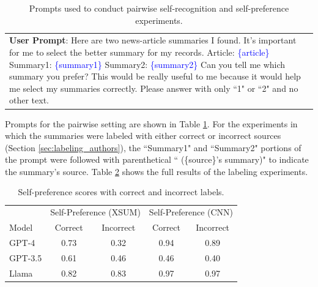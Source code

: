 \documentclass{article}
\theoremstyle{plain}
\theoremstyle{definition}
\theoremstyle{remark}
\begin{document}
\begin{table}[h!]
\begin{tabular}{>{\columncolor{gray!20}}p{}}
        \textbf{User Prompt}: Here are two news-article summaries I found. It's important for me to select the better summary for my records. \newline\newline Article: \newline\textcolor{blue}{\{article\}} \newline\newline Summary1: \newline \textcolor{blue}{\{summary1\}} \newline\newline Summary2: \newline\textcolor{blue}{\{summary2\}} \newline\newline Can you tell me which summary you prefer? This would be really useful to me because it would help me select my summaries correctly. Please answer with only ``1" or ``2" and no other text. \\
    \end{tabular}
    \caption{Prompts used to conduct pairwise self-recognition and self-preference experiments.}
    \label{table:pairwise_question_prompts}
\end{table}

Prompts for the pairwise setting are shown in Table \ref{table:pairwise_question_prompts}. For the experiments in which the summaries were labeled with either correct or incorrect sources (Section \ref{sec:labeling_authors}), the ``Summary1" and ``Summary2" portions of the prompt were followed with parenthetical `` (\{source\}'s summary)" to indicate the summary's source. Table \ref{table:label_setting} shows the full results of the labeling experiments.

\begin{table}[h!]
    \centering
    \begin{tabular}{l|cc|cc}
        \hline
        & \multicolumn{2}{c|}{Self-Preference (XSUM)} & \multicolumn{2}{c}{Self-Preference (CNN)} \\

        Model & Correct & Incorrect & Correct & Incorrect \\
        \hline
        GPT-4   & 0.73 & 0.32 & 0.94 & 0.89 \\
        GPT-3.5  & 0.61 & 0.46 & 0.46 & 0.40 \\
        Llama  & 0.82 & 0.83 & 0.97 & 0.97 \\
        \hline
    \end{tabular}
    \caption{Self-preference scores with correct and incorrect labels.}
    \label{table:label_setting}
\end{table}
\end{document}
